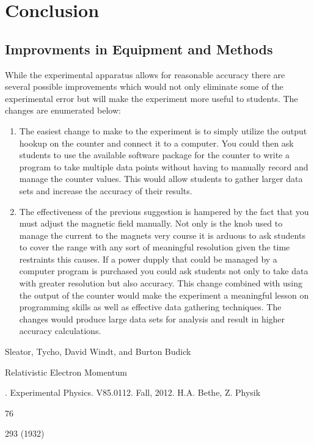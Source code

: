 \section{Conclusion}
\subsection{Improvments in Equipment and Methods}
While the experimental apparatus allows for reasonable accuracy there are several possible improvements which would not only eliminate some of the experimental error but will make the experiment more useful to students.  The changes are enumerated below:
\begin{enumerate}
\item The easiest change to make to the experiment is to simply utilize the output hookup on the counter and connect it to a computer. You could then ask students to use the available software package for the counter to write a program to take multiple data points without having to manually record and manage the counter values.  This would allow students to gather larger data sets and increase the accuracy of their results. 
\item The effectiveness of the previous suggestion is hampered by the fact that you must adjust the magnetic field manually.  Not only is the knob used to manage the current to the magnets very course it is arduous to ask students to cover the range with any sort of meaningful resolution given the time restraints this causes.  If a power dupply that could be managed by a computer program is purchased you could ask students not only to take data with greater resolution but also accuracy. This change combined with using the output of the counter would make the experiment a meaningful lesson on programming skills as well as effective data gathering techniques. The changes would produce large data sets for analysis and result in higher accuracy calculations.  
\end{enumerate} 


\begin{thebibliography}{99}
Sleator, Tycho, David Windt, and Burton Budick \begin{em}Relativistic Electron Momentum\end{em}. Experimental Physics. V85.0112. Fall, 2012.
 H.A. Bethe, Z. Physik \begin{em} 76 \end{em} 293 (1932)
\end{thebibliography}

